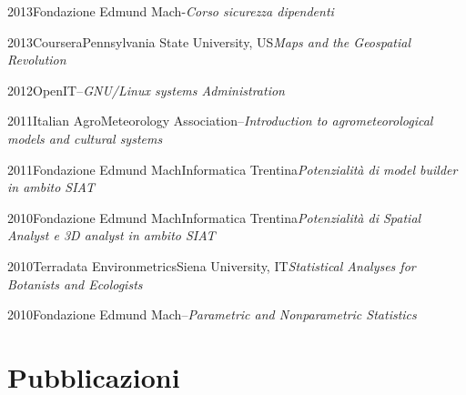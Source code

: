 \documentclass{curriculum}
\begin{document}
    \begin{entrylist}
    \entry
        {2013}{Fondazione Edmund Mach}{-}{\emph{Corso sicurezza dipendenti}}
    \end{entrylist}
    
    \begin{entrylist}
    \entry
        {2013}{Coursera}{Pennsylvania State University, US}{\emph{Maps and the Geospatial Revolution}}
    \end{entrylist}
    
    \begin{entrylist}
    \entry
        {2012}{OpenIT}{--}{\emph{GNU/Linux systems Administration}}
    \end{entrylist}
    
    \begin{entrylist}
    \entry
        {2011}{Italian AgroMeteorology Association}{--}{\emph{Introduction to agrometeorological models and cultural systems}}
    \end{entrylist}
    
    \begin{entrylist}
    \entry
        {2011}{Fondazione Edmund Mach}{Informatica Trentina}{\emph{Potenzialità di model builder in ambito SIAT}}
    \end{entrylist}   
    
    \begin{entrylist}
    \entry
        {2010}{Fondazione Edmund Mach}{Informatica Trentina}{\emph{Potenzialità di Spatial Analyst e 3D analyst in ambito SIAT}}
    \end{entrylist} 
    
    \begin{entrylist}
    \entry
        {2010}{Terradata Environmetrics}{Siena University, IT}{\emph{Statistical Analyses for Botanists and Ecologists}}
    \end{entrylist}
    
    \begin{entrylist}
    \entry
        {2010}{Fondazione Edmund Mach}{--}{\emph{Parametric and Nonparametric Statistics}}
    \end{entrylist}

    
    \section{Pubblicazioni}
    \vspace{-0.75cm}
    \begin{refsection}
        \nocite{*}
        \newrefcontext[sorting=ydnt]
        \printbibliography[type=article, title={\textit{peer reviewed}}, heading=subbibliography]
    \end{refsection}
    
\end{document}
